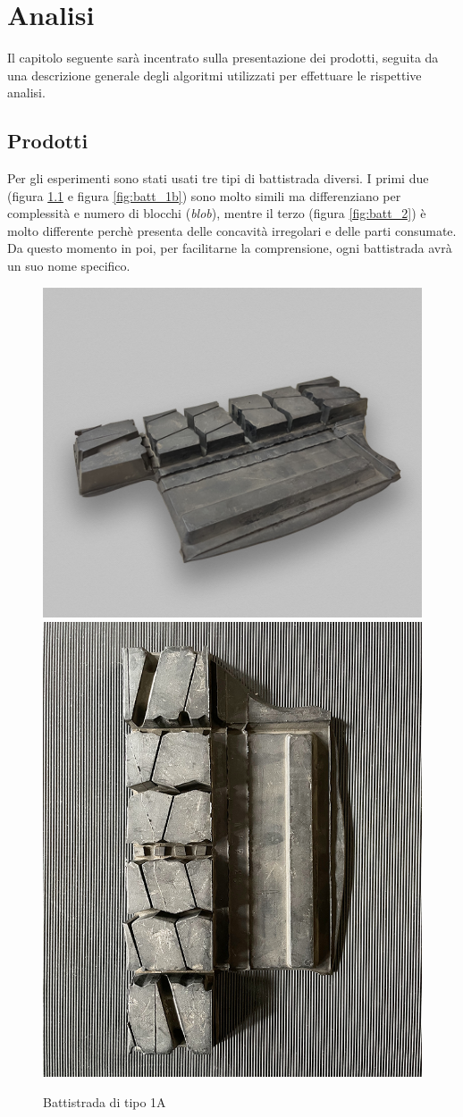 \chapter{Analisi}
\label{Cha:analisi}
\thispagestyle{empty}

Il capitolo seguente sarà incentrato sulla presentazione dei prodotti, seguita da una descrizione generale degli algoritmi utilizzati per effettuare le rispettive analisi.

\section{Prodotti}
Per gli esperimenti sono stati usati tre tipi di battistrada diversi. I primi due (figura \ref{fig:batt_1a} e figura \ref{fig:batt_1b}) sono molto simili ma differenziano per complessità e numero di blocchi (\textit{blob}), mentre il terzo (figura \ref{fig:batt_2}) è molto differente perchè presenta delle concavità irregolari e delle parti consumate.\\
Da questo momento in poi, per facilitarne la comprensione, ogni battistrada avrà un suo nome specifico.\\

\begin{figure}[H]
	\centering
	\includegraphics[height=0.41\columnwidth]{./pictures/batt_1a_1.png}
	\includegraphics[height=0.41\columnwidth]{./pictures/batt_1a_2.png}
	\caption{Battistrada di tipo 1A}\label{fig:batt_1a}
\end{figure}

